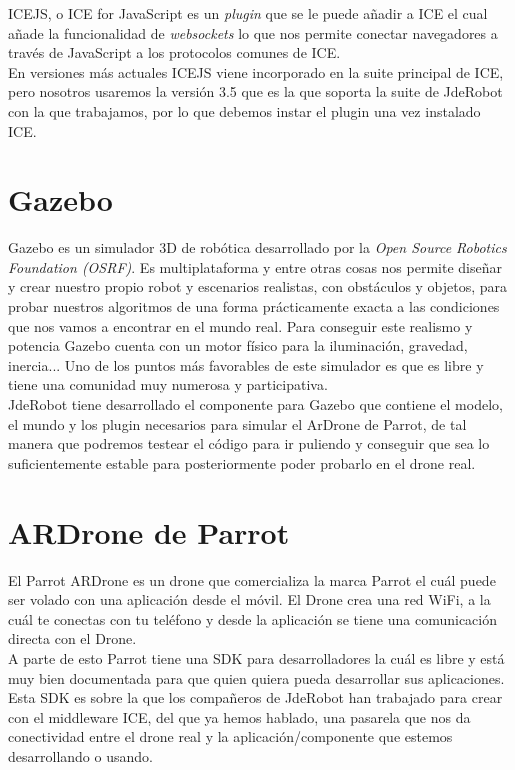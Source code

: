 ICEJS, o ICE for JavaScript es un \textit{plugin} que se le puede añadir a ICE el cual añade la funcionalidad de \textit{websockets} lo que nos permite conectar navegadores a través de JavaScript a los protocolos comunes de ICE. \\

En versiones más actuales ICEJS viene incorporado en la suite principal de ICE, pero nosotros usaremos la versión 3.5 que es la que soporta la suite de JdeRobot con la que trabajamos, por lo que debemos instar el plugin una vez instalado ICE.\\

\section{Gazebo}

Gazebo es un simulador 3D de robótica desarrollado por la \textit{Open Source Robotics Foundation (OSRF)}. Es multiplataforma y entre otras cosas nos permite diseñar y crear nuestro propio robot y escenarios realistas, con obstáculos y objetos, para probar nuestros algoritmos de una forma prácticamente exacta a las condiciones que nos vamos a encontrar en el mundo real. Para conseguir este realismo y potencia Gazebo cuenta con un motor físico para la iluminación, gravedad, inercia... Uno de los puntos más favorables de este simulador es que es libre y tiene una comunidad muy numerosa y participativa.\\

JdeRobot tiene desarrollado el componente para Gazebo que contiene el modelo, el mundo y los plugin necesarios para simular el ArDrone de Parrot, de tal manera que podremos testear el código para ir puliendo y conseguir que sea lo suficientemente estable para posteriormente poder probarlo en el drone real.


\section{ARDrone de Parrot}

El Parrot ARDrone es un drone que comercializa la marca Parrot el cuál puede ser volado con una aplicación desde el móvil. El Drone crea una red WiFi, a la cuál te conectas con tu teléfono y desde la aplicación se tiene una comunicación directa con el Drone.\\

A parte de esto Parrot tiene una SDK para desarrolladores la cuál es libre y está muy bien documentada para que quien quiera pueda desarrollar sus aplicaciones. Esta SDK es sobre la que los compañeros de JdeRobot han trabajado para crear con el middleware ICE, del que ya hemos hablado, una pasarela que nos da conectividad entre el drone real y la aplicación/componente que estemos desarrollando o usando.









